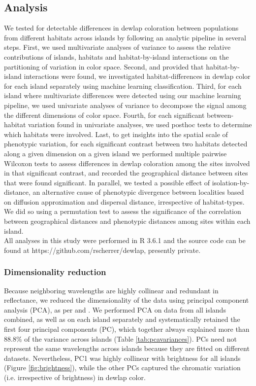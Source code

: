 \subsection*{Analysis}

We tested for detectable differences in dewlap coloration between populations from different habitats across islands by following an analytic pipeline in several steps. First, we used multivariate analyses of variance to assess the relative contributions of islands, habitats and habitat-by-island interactions on the partitioning of variation in color space. Second, and provided that habitat-by-island interactions were found, we investigated habitat-differences in dewlap color for each island separately using machine learning classification. Third, for each island where multivariate differences were detected using our machine learning pipeline, we used univariate analyses of variance to decompose the signal among the different dimensions of color space. Fourth, for each significant between-habitat variation found in univariate analyses, we used posthoc tests to determine which habitats were involved. Last, to get insights into the spatial scale of phenotypic variation, for each significant contrast between two habitats detected along a given dimension on a given island we performed multiple pairwise Wilcoxon tests to assess differences in dewlap coloration among the sites involved in that significant contrast, and recorded the geographical distance between sites that were found significant. In parallel, we tested a possible effect of isolation-by-distance, an alternative cause of phenotypic divergence between localities based on diffusion approximation and dispersal distance, irrespective of habitat-types. We did so using a permutation test to assess the significance of the correlation between geographical distances and phenotypic distances among sites within each island.\\

All analyses in this study were performed in R 3.6.1 \citep{RCoreTeam2019} and the source code can be found at https://github.com/rscherrer/dewlap, presently private.

\subsubsection*{Dimensionality reduction}

Because neighboring wavelengths are highly collinear and redundant in reflectance, we reduced the dimensionality of the data using principal component analysis (PCA), as per \citet{Cuthill1999} and \citet{Leal2002}. We performed PCA on data from all islands combined, as well as on each island separately and systematically retained the first four principal components (PC), which together always explained more than $88.8\%$ of the variance across islands (Table \ref{tab:pcavariances}). PCs need not represent the same wavelengths across islands because they are fitted on different datasets. Nevertheless, PC1 was highly collinear with brightness for all islands (Figure \ref{fig:brightness}), while the other PCs captured the chromatic variation (i.e. irrespective of brightness) in dewlap color.

